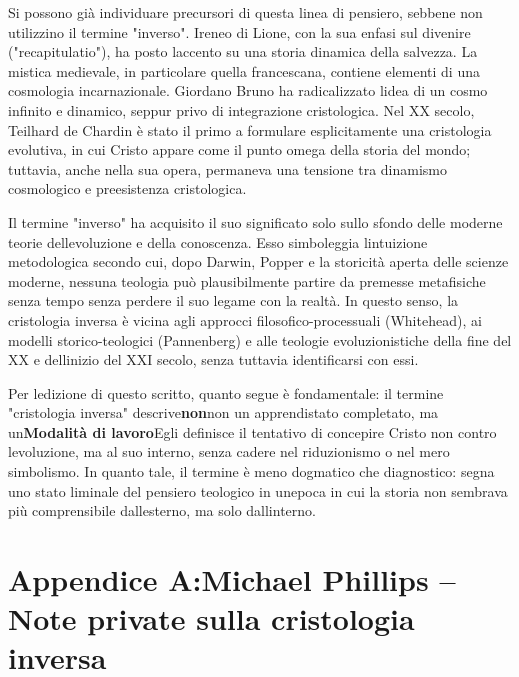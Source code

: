 \documentclass[
]{article}
\begin{document}
Si possono già individuare precursori di questa linea di pensiero, sebbene non utilizzino il termine "inverso". Ireneo di Lione, con la sua enfasi sul divenire ("recapitulatio"), ha posto l\textquotesingle accento su una storia dinamica della salvezza. La mistica medievale, in particolare quella francescana, contiene elementi di una cosmologia incarnazionale. Giordano Bruno ha radicalizzato l\textquotesingle idea di un cosmo infinito e dinamico, seppur privo di integrazione cristologica. Nel XX secolo, Teilhard de Chardin è stato il primo a formulare esplicitamente una cristologia evolutiva, in cui Cristo appare come il punto omega della storia del mondo; tuttavia, anche nella sua opera, permaneva una tensione tra dinamismo cosmologico e preesistenza cristologica.

Il termine "inverso" ha acquisito il suo significato solo sullo sfondo delle moderne teorie dell\textquotesingle evoluzione e della conoscenza. Esso simboleggia l\textquotesingle intuizione metodologica secondo cui, dopo Darwin, Popper e la storicità aperta delle scienze moderne, nessuna teologia può plausibilmente partire da premesse metafisiche senza tempo senza perdere il suo legame con la realtà. In questo senso, la cristologia inversa è vicina agli approcci filosofico-processuali (Whitehead), ai modelli storico-teologici (Pannenberg) e alle teologie evoluzionistiche della fine del XX e dell\textquotesingle inizio del XXI secolo, senza tuttavia identificarsi con essi.

Per l\textquotesingle edizione di questo scritto, quanto segue è fondamentale: il termine "cristologia inversa" descrive\textbf{non}non un apprendistato completato, ma un\textbf{Modalità di lavoro}Egli definisce il tentativo di concepire Cristo non contro l\textquotesingle evoluzione, ma al suo interno, senza cadere nel riduzionismo o nel mero simbolismo. In quanto tale, il termine è meno dogmatico che diagnostico: segna uno stato liminale del pensiero teologico in un\textquotesingle epoca in cui la storia non sembrava più comprensibile dall\textquotesingle esterno, ma solo dall\textquotesingle interno.

\section{\texorpdfstring{Appendice A:\textbf{Michael Phillips -- Note private sulla cristologia inversa}}{Appendice A:Michael Phillips -- Note private sulla cristologia inversa}}\label{appendice-amichael-phillips-note-private-sulla-cristologia-inversa}
\end{document}
